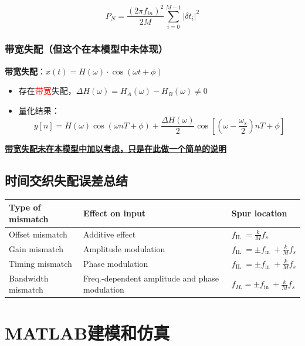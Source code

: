 \documentclass[cs4size,a4paper]{ctexart}
\numberwithin{equation}{section}
\numberwithin{table}{section}
\numberwithin{figure}{section}
\begin{document}
		\begin{equation}
			P_N=\frac{\left(2 \pi f_{i n}\right)^2}{2 M} \sum_{i=0}^{M-1}\left|\delta t_i\right|^2
		\end{equation}
		
		
		\subsubsection{带宽失配（但这个在本模型中未体现）}
		\textbf{带宽失配}：$x(t) = H(\omega) \cdot \cos(\omega t + \phi)$
		\begin{itemize}
			\item 存在\textcolor{red}{带宽}失配，$\Delta H(\omega) = H_A(\omega) - H_B(\omega) \neq 0$
			\item 量化结果：
			\[
			y[n] = H(\omega) \cos(\omega nT + \phi) + \frac{\Delta H(\omega)}{2} \cos\left[\left( \omega - \frac{\omega_s}{2} \right) nT + \phi \right]
			\]
		\end{itemize}
		\underline{\textbf{带宽失配未在本模型中加以考虑，只是在此做一个简单的说明}}
		
		\subsection{时间交织失配误差总结}
		\begin{flushleft}
					\begin{tabular}{|l|l|l|}
					\hline \textbf{Type of mismatch} & \textbf{Effect on input} & \textbf{Spur location} \\
					\hline Offset mismatch & Additive effect & $f_{\text {IL }}=\frac{k}{M} f_s$ \\
					\hline Gain mismatch & Amplitude modulation & $f_{\text {IL }}= \pm f_{\text {in }}+\frac{k}{M} f_s$ \\
					\hline Timing mismatch & Phase modulation & $f_{\text {IL }}= \pm f_{\text {in }}+\frac{k}{M} f_s$ \\
					\hline Bandwidth mismatch & Freq.-dependent amplitude and phase modulation & $f_{I L}= \pm f_{\text {in }}+\frac{k}{M} f_s$ \\
					\hline
				\end{tabular}
		\end{flushleft}
		
\section{MATLAB建模和仿真}
\end{document}
